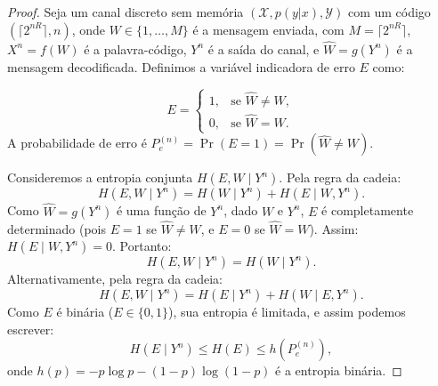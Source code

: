 \begin{proof}

Seja um canal discreto sem memória $(\mathcal{X}, p(y|x), \mathcal{Y})$ com um código 
$(\lceil 2^{nR} \rceil, n)$, onde $W \in \{1, \ldots, M\}$ é a mensagem enviada, com 
$M = \lceil 2^{nR} \rceil$, $X^n = f(W)$ é a palavra-código, $Y^n$ é a saída do
canal, e $\hat{W} = g(Y^n)$ é a mensagem decodificada. Definimos a variável
indicadora de erro $E$ como:

\begin{equation}
E = \begin{cases} 
1, & \text{se } \hat{W} \neq W, \\
0, & \text{se } \hat{W} = W.
\end{cases}
\end{equation}
A probabilidade de erro é $P_e^{(n)} = \Pr(E = 1) = \Pr(\hat{W} \neq W)$.

Consideremos a entropia conjunta $H(E, W \mid Y^n)$. Pela regra da cadeia:
\begin{equation}
H(E, W \mid Y^n) = H(W \mid Y^n) + H(E \mid W, Y^n).
\end{equation}
Como $\hat{W} = g(Y^n)$ é uma função de $Y^n$, dado $W$ e $Y^n$, 
$E$ é completamente determinado (pois $E = 1$ se $\hat{W} \neq W$, e $E = 0$ se $\hat{W} = W$). 
Assim: $H(E \mid W, Y^n) = 0$.
Portanto:
  \begin{equation}\label{eq:fanoHEWmidYn}
H(E, W \mid Y^n) = H(W \mid Y^n).
\end{equation}
Alternativamente, pela regra da cadeia:
\begin{equation}
H(E, W \mid Y^n) = H(E \mid Y^n) + H(W \mid E, Y^n).
\end{equation}
Como $E$ é binária ($E \in \{0, 1\}$), sua entropia é limitada, e assim podemos escrever:
\begin{equation}
H(E \mid Y^n) \leq H(E) \leq h(P_e^{(n)}),
\end{equation}
onde $h(p) = -p \log p - (1-p) \log (1-p)$ é a entropia binária.


\end{proof}

